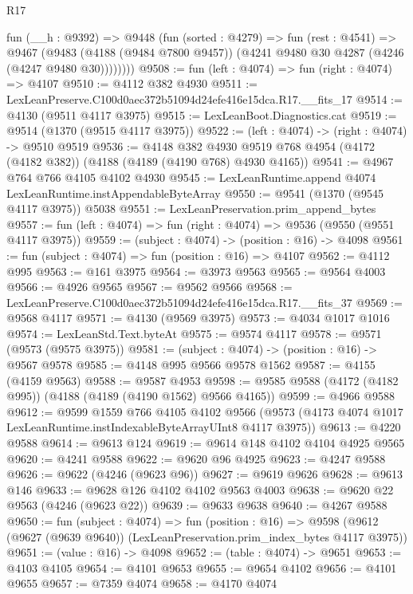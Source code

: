\begin{lexlean}{R17}
\begin{coremodule}
        fun (__h : @9392) =>
        @9448
          (fun (sorted : @4279) =>
          fun (rest : @4541) =>
          @9467
            (@9483
              (@4188 (@9484 @7800 @9457))
              (@4241 @9480 @30 @4287 (@4246 (@4247 @9480 @30))))))))
@9508 := fun (left : @4074) => fun (right : @4074) => @4107
@9510 := @4112 @382 @4930
@9511 := LexLeanPreserve.C100d0aec372b51094d24efe416e15dca.R17.__fits_17
@9514 := @4130 (@9511 @4117 @3975)
@9515 := LexLeanBoot.Diagnostics.cat
@9519 := @9514 (@1370 (@9515 @4117 @3975))
@9522 := (left : @4074) -> (right : @4074) -> @9510 @9519
@9536 := @4148
    @382
    @4930
    @9519
    @768
    @4954
    (@4172 (@4182 @382))
    (@4188 (@4189 (@4190 @768) @4930 @4165))
@9541 := @4967 @764 @766 @4105 @4102 @4930
@9545 := LexLeanRuntime.append @4074 LexLeanRuntime.instAppendableByteArray
@9550 := @9541 (@1370 (@9545 @4117 @3975)) @5038
@9551 := LexLeanPreservation.prim_append_bytes
@9557 := fun (left : @4074) => fun (right : @4074) => @9536 (@9550 (@9551 @4117 @3975))
@9559 := (subject : @4074) -> (position : @16) -> @4098
@9561 := fun (subject : @4074) => fun (position : @16) => @4107
@9562 := @4112 @995
@9563 := @161 @3975
@9564 := @3973 @9563
@9565 := @9564 @4003
@9566 := @4926 @9565
@9567 := @9562 @9566
@9568 := LexLeanPreserve.C100d0aec372b51094d24efe416e15dca.R17.__fits_37
@9569 := @9568 @4117
@9571 := @4130 (@9569 @3975)
@9573 := @4034 @1017 @1016
@9574 := LexLeanStd.Text.byteAt
@9575 := @9574 @4117
@9578 := @9571 (@9573 (@9575 @3975))
@9581 := (subject : @4074) -> (position : @16) -> @9567 @9578
@9585 := @4148 @995 @9566 @9578 @1562
@9587 := @4155 (@4159 @9563)
@9588 := @9587 @4953
@9598 := @9585 @9588 (@4172 (@4182 @995)) (@4188 (@4189 (@4190 @1562) @9566 @4165))
@9599 := @4966 @9588
@9612 := @9599
    @1559
    @766
    @4105
    @4102
    @9566
    (@9573 (@4173 @4074 @1017 LexLeanRuntime.instIndexableByteArrayUInt8 @4117 @3975))
@9613 := @4220 @9588
@9614 := @9613 @124
@9619 := @9614 @148 @4102 @4104 @4925 @9565
@9620 := @4241 @9588
@9622 := @9620 @96 @4925
@9623 := @4247 @9588
@9626 := @9622 (@4246 (@9623 @96))
@9627 := @9619 @9626
@9628 := @9613 @146
@9633 := @9628 @126 @4102 @4102 @9563 @4003
@9638 := @9620 @22 @9563 (@4246 (@9623 @22))
@9639 := @9633 @9638
@9640 := @4267 @9588
@9650 := fun (subject : @4074) =>
  fun (position : @16) =>
  @9598 (@9612 (@9627 (@9639 @9640)) (LexLeanPreservation.prim_index_bytes @4117 @3975))
@9651 := (value : @16) -> @4098
@9652 := (table : @4074) -> @9651
@9653 := @4103 @4105
@9654 := @4101 @9653
@9655 := @9654 @4102
@9656 := @4101 @9655
@9657 := @7359 @4074
@9658 := @4170 @4074

\end{coremodule}
\end{lexlean}
